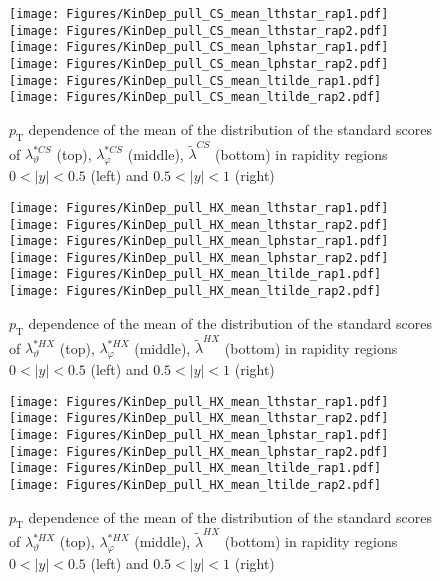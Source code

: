 \documentclass[12pt]{article}
\newcommand{\pT}{p_\mathrm{T}}
\newcommand{\absy}{\left |  y \right |}
\newcommand{\lamtildeCS}{\tilde{\lambda}^{\scriptscriptstyle CS}}
\newcommand{\lamthstarCS}{\lambda^{* \scriptscriptstyle CS}_\vartheta}
\newcommand{\lamphstarCS}{\lambda^{* \scriptscriptstyle CS}_\varphi}
\newcommand{\lamtildeHX}{\tilde{\lambda}^{\scriptscriptstyle HX}}
\newcommand{\lamthstarHX}{\lambda^{* \scriptscriptstyle HX}_\vartheta}
\newcommand{\lamphstarHX}{\lambda^{* \scriptscriptstyle HX}_\varphi}
\begin{document}
\begin{figure}[htbp]
\centering
\texttt{[image: Figures/KinDep\_pull\_CS\_mean\_lthstar\_rap1.pdf]}
\texttt{[image: Figures/KinDep\_pull\_CS\_mean\_lthstar\_rap2.pdf]}
\texttt{[image: Figures/KinDep\_pull\_CS\_mean\_lphstar\_rap1.pdf]}
\texttt{[image: Figures/KinDep\_pull\_CS\_mean\_lphstar\_rap2.pdf]}
\texttt{[image: Figures/KinDep\_pull\_CS\_mean\_ltilde\_rap1.pdf]}
\texttt{[image: Figures/KinDep\_pull\_CS\_mean\_ltilde\_rap2.pdf]}
\caption{$\pT$ dependence of the mean of the distribution of the standard scores
of $\lamthstarCS$ (top), $\lamphstarCS$ (middle), $\lamtildeCS$ (bottom) in
rapidity regions $0<\absy<0.5$ (left) and $0.5<\absy<1$ (right)}
\end{figure}
\clearpage




\begin{figure}[htbp]
\centering
\texttt{[image: Figures/KinDep\_pull\_HX\_mean\_lthstar\_rap1.pdf]}
\texttt{[image: Figures/KinDep\_pull\_HX\_mean\_lthstar\_rap2.pdf]}
\texttt{[image: Figures/KinDep\_pull\_HX\_mean\_lphstar\_rap1.pdf]}
\texttt{[image: Figures/KinDep\_pull\_HX\_mean\_lphstar\_rap2.pdf]}
\texttt{[image: Figures/KinDep\_pull\_HX\_mean\_ltilde\_rap1.pdf]}
\texttt{[image: Figures/KinDep\_pull\_HX\_mean\_ltilde\_rap2.pdf]}
\caption{$\pT$ dependence of the mean of the distribution of the standard scores
of $\lamthstarHX$ (top), $\lamphstarHX$ (middle), $\lamtildeHX$ (bottom) in
rapidity regions $0<\absy<0.5$ (left) and $0.5<\absy<1$ (right)}
\end{figure}
\clearpage


\begin{figure}[htbp]
\centering
\texttt{[image: Figures/KinDep\_pull\_HX\_mean\_lthstar\_rap1.pdf]}
\texttt{[image: Figures/KinDep\_pull\_HX\_mean\_lthstar\_rap2.pdf]}
\texttt{[image: Figures/KinDep\_pull\_HX\_mean\_lphstar\_rap1.pdf]}
\texttt{[image: Figures/KinDep\_pull\_HX\_mean\_lphstar\_rap2.pdf]}
\texttt{[image: Figures/KinDep\_pull\_HX\_mean\_ltilde\_rap1.pdf]}
\texttt{[image: Figures/KinDep\_pull\_HX\_mean\_ltilde\_rap2.pdf]}
\caption{$\pT$ dependence of the mean of the distribution of the standard scores
of $\lamthstarHX$ (top), $\lamphstarHX$ (middle), $\lamtildeHX$ (bottom) in
rapidity regions $0<\absy<0.5$ (left) and $0.5<\absy<1$ (right)}
\end{figure}
\clearpage
\end{document}
